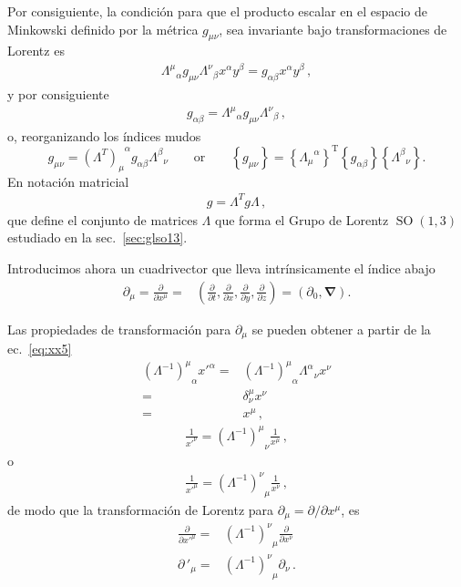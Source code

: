 \begin{frame}
Por consiguiente, la condición para que el producto escalar  en el espacio de Minkowski definido por la métrica $g_{\mu\nu}$, sea invariante bajo transformaciones de Lorentz es
\begin{align}
  {\Lambda^{\mu}}_{\alpha}g_{\mu\nu}{\Lambda^{\nu}}_{\beta}x^{\alpha}y^{\beta}=
  g_{\alpha\beta}x^{\alpha}y^{\beta}\,,
\end{align}
y por consiguiente
\begin{align}
  g_{\alpha\beta}={\Lambda^{\mu}}_{\alpha}g_{\mu\nu}{\Lambda^{\nu}}_{\beta}\,,
\end{align}
o, reorganizando los índices mudos
\begin{equation}
  \label{eq:lrinv}
  g_{\mu\nu}={(\Lambda^{T})_{\mu}}^\alpha g_{\alpha\beta}{\Lambda^\beta}_{\nu}\qquad\text{or}\qquad 
\left\{g_{\mu\nu}\right\}=\left\{{\Lambda_{\mu}}^{\alpha}\right\}^{\text{T}}\left\{g_{\alpha\beta}\right\}\left\{{\Lambda^\beta}_{\nu}\right\}.
\end{equation}
En notaci\'on matricial
\begin{align}
 g=\Lambda^T g \Lambda\,,
\end{align}
que define el conjunto de matrices $\Lambda$ que forma el Grupo de Lorentz $\operatorname{SO}(1,3)$ estudiado en la sec.~\ref{sec:glso13}.

Introducimos ahora un cuadrivector que lleva intrínsicamente el índice abajo
\begin{align}
   \partial_\mu=\frac{\partial}{\partial x^\mu}=&\left(
    \frac{\partial}{\partial t},\frac{\partial}{\partial x},\frac{\partial}{\partial y},\frac{\partial}{\partial z}
  \right)
  =(\partial_0,\boldsymbol{\nabla}).
\end{align}



Las propiedades de transformación para $\partial_\mu$ se pueden obtener a partir de la ec.~\eqref{eq:xx5}
\begin{align}
  {\left(\Lambda^{-1}\right)^\mu}_\alpha{x'}^\alpha=&{\left(\Lambda^{-1}\right)^\mu}_\alpha{\Lambda^\alpha}_\nu x^\nu\nonumber\\
=&\delta^\mu_\nu x^\nu\nonumber\\
=&x^\mu\,,
\end{align}
\begin{align}
  \frac{1}{{x'}^\nu}= {\left(\Lambda^{-1}\right)^\mu}_\nu\frac{1}{x^\mu}\,,
\end{align}
o
\begin{align}
  \label{eq:183qft}
    \frac{1}{{x'}^\mu}= {\left(\Lambda^{-1}\right)^\nu}_\mu\frac{1}{x^\nu}\,,
\end{align}
de modo que la transformación de Lorentz para $\partial_\mu=\partial/\partial x^\mu$, es
\begin{align}
  \label{dmulrtran}
   \frac{\partial}{{\partial x'}^\mu}=& {\left(\Lambda^{-1}\right)^\nu}_\mu\frac{\partial}{\partial x^\nu}\nonumber\\
   {\partial\,}'_\mu=& {\left(\Lambda^{-1}\right)^\nu}_\mu\partial_\nu\,.
\end{align}


\end{frame}
